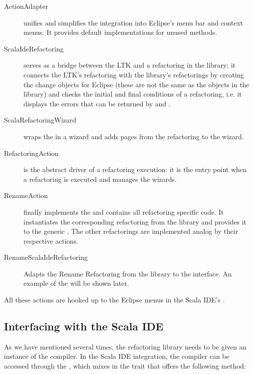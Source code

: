 \documentclass[10pt,a4paper,oneside]{scrreprt}
\begin{document}
\begin{description}
  \item[ActionAdapter] unifies and simplifies the integration into Eclipse's menu bar and context menus. It provides default implementations for unused methods.
  
  \item[ScalaIdeRefactoring] serves as a bridge between the LTK and a refactoring in the library; it connects the LTK's refactoring with the library's refactorings by creating the change objects for Eclipse (these are not the same as the  objects in the library) and checks the initial and final conditions of a refactoring, i.e. it displays the errors that can be returned by  and .
  
  \item[ScalaRefactoringWizard] wraps the  in a wizard and adds pages from the refactoring to the wizard.
  
  \item[RefactoringAction] is the abstract driver of a refactoring execution: it is the entry point when a refactoring is executed and manages the wizards.
  
  \item[RenameAction] finally implements the  and contains all refactoring specific code. It instantiates the corresponding refactoring from the library and provides it to the generic . The other refactorings are implemented analog by their respective actions.
  
  \item[RenameScalaIdeRefactoring] Adapts the Rename Refactoring from the library to the  interface. An example of the  will be shown later.
\end{description}

All these actions are hooked up to the Eclipse menus in the Scala IDE's .

\subsection{Interfacing with the Scala IDE}

As we have mentioned several times, the refactoring library needs to be given an instance of the compiler. In the Scala IDE integration, the compiler can be accessed through the , which mixes in the  trait that offers the following method:
\end{document}
